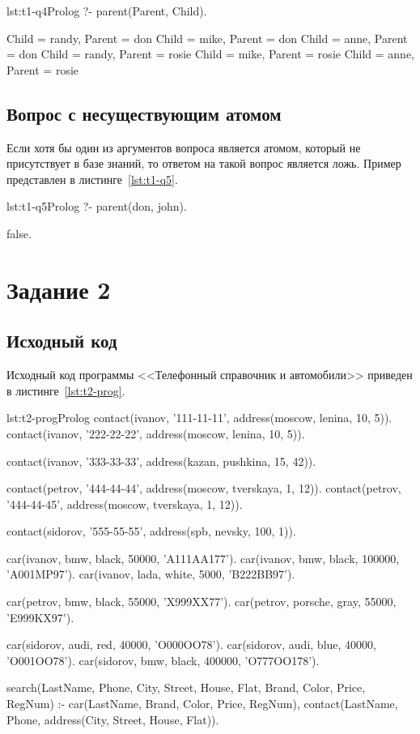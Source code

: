 \begin{listing}{lst:t1-q4}{Prolog}
?- parent(Parent, Child).

Child = randy,
Parent = don
Child = mike,
Parent = don
Child = anne,
Parent = don
Child = randy,
Parent = rosie
Child = mike,
Parent = rosie
Child = anne,
Parent = rosie
\end{listing}

\subsection{Вопрос с несуществующим атомом}
Если хотя бы один из аргументов вопроса является атомом, который не присутствует в базе знаний,
то ответом на такой вопрос является ложь. Пример представлен в листинге~\ref{lst:t1-q5}.
\begin{listing}{lst:t1-q5}{Prolog}
?- parent(don, john).

false.
\end{listing}

\section{Задание 2}
\subsection{Исходный код}
Исходный код программы <<Телефонный справочник и автомобили>> приведен в листинге~\ref{lst:t2-prog}.
\begin{listing}{lst:t2-prog}{Prolog}
contact(ivanov, '111-11-11', address(moscow, lenina, 10, 5)).
contact(ivanov, '222-22-22', address(moscow, lenina, 10, 5)).

contact(ivanov, '333-33-33', address(kazan, pushkina, 15, 42)).

contact(petrov, '444-44-44', address(moscow, tverskaya, 1, 12)).
contact(petrov, '444-44-45', address(moscow, tverskaya, 1, 12)).

contact(sidorov, '555-55-55', address(spb, nevsky, 100, 1)).


car(ivanov, bmw, black, 50000, 'A111AA177').
car(ivanov, bmw, black, 100000, 'A001MP97').
car(ivanov, lada, white, 5000, 'B222BB97').

car(petrov, bmw, black, 55000, 'X999XX77').
car(petrov, porsche, gray, 55000, 'E999KX97').

car(sidorov, audi, red, 40000, 'O000OO78').
car(sidorov, audi, blue, 40000, 'O001OO78').
car(sidorov, bmw, black, 400000, 'O777OO178').


search(LastName, Phone, City, Street, House, Flat, Brand, Color, Price, RegNum) :-
    car(LastName, Brand, Color, Price, RegNum),
    contact(LastName, Phone, address(City, Street, House, Flat)).
\end{listing}

